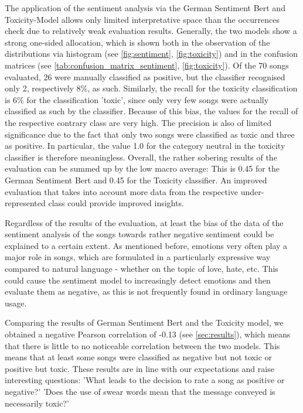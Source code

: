 The application of the sentiment analysis via the German Sentiment Bert and Toxicity-Model allows only limited interpretative space than the occurrences check due to relatively weak evaluation results. Generally, the two models show a strong one-sided allocation, which is shown both in the observation of the distributions via histogram (see \autoref{fig:sentiment}, \autoref{fig:toxicity}) and in the confusion matrices (see \autoref{tab:confusion_matrix_sentiment}, \autoref{fig:toxicity}). Of the 70 songs evaluated, 26 were manually classified as positive, but the classifier recognised only 2, respectively 8\%, as such. Similarly, the recall for the toxicity classification is 6\% for the classification 'toxic', since only very few songs were actually classified as such by the classifier. Because of this bias, the values for the recall of the respective contrary class are very high. The precision is also of limited significance due to the fact that only two songs were classified as toxic and three as positive. In particular, the value 1.0 for the category neutral in the toxicity classifier is therefore meaningless. Overall, the rather sobering results of the evaluation can be summed up by the low macro average: This is 0.45 for the German Sentiment Bert and 0.45 for the Toxicity classifier. An improved evaluation that takes into account more data from the respective under-represented class could provide improved insights.

Regardless of the results of the evaluation, at least the bias of the data of the sentiment analysis of the songs towards rather negative sentiment could be explained to a certain extent. As mentioned before, emotions very often play a major role in songs, which are formulated in a particularly expressive way compared to natural language - whether on the topic of love, hate, etc. This could cause the sentiment model to increasingly detect emotions and then evaluate them as negative, as this is not frequently found in ordinary language usage.

Comparing the results of German Sentiment Bert and the Toxicity model, we obtained a negative Pearson correlation of -0.13 (see \autoref{sec:results}), which means that there is little to no noticeable correlation between the two models. This means that at least some songs were classified as negative but not toxic or positive but toxic. These results are in line with our expectations and raise interesting questions: 'What leads to the decision to rate a song as positive or negative?' 'Does the use of swear words mean that the message conveyed is necessarily toxic?' 

